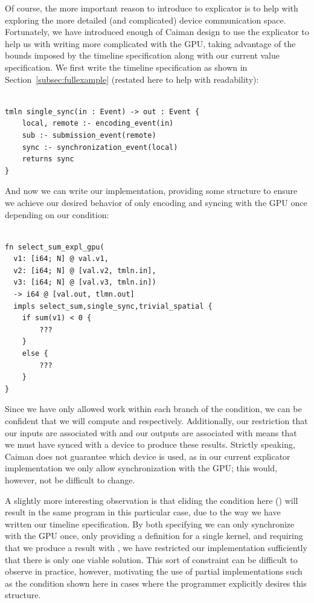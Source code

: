 Of course, the more important reason to introduce to explicator is to help with exploring the more detailed (and complicated) device communication space.  Fortunately, we have introduced enough of Caiman design to use the explicator to help us with writing more complicated with the GPU, taking advantage of the bounds imposed by the timeline specification along with our current value specification.  We first write the timeline specification as shown in Section~\ref{subsec:fullexample} (restated here to help with readability):
%
\begin{lstlisting}

tmln single_sync(in : Event) -> out : Event {
    local, remote :- encoding_event(in)
    sub :- submission_event(remote)
    sync :- synchronization_event(local)
    returns sync
}
\end{lstlisting}
%
And now we can write our implementation, providing some structure to ensure we achieve our desired behavior of only encoding and syncing with the GPU once depending on our condition:
%
\begin{lstlisting}

fn select_sum_expl_gpu(
  v1: [i64; N] @ val.v1, 
  v2: [i64; N] @ [val.v2, tmln.in], 
  v3: [i64; N] @ [val.v3, tmln.in]) 
  -> i64 @ [val.out, tlmn.out] 
  impls select_sum,single_sync,trivial_spatial {
    if sum(v1) < 0 {
        ???
    }
    else {
        ???
    } 
}
\end{lstlisting}
%
Since we have only allowed work within each branch of the condition, we can be confident that we will compute  and  respectively.  Additionally, our restriction that our inputs are associated with  and our outputs are associated with  means that we must have synced with a device to produce these results.  Strictly speaking, Caiman does not guarantee which device is used, as in our current explicator implementation we only allow synchronization with the GPU; this would, however, not be difficult to change.

A slightly more interesting observation is that eliding the condition here () will result in the same program in this particular case, due to the way we have written our timeline specification.  By both specifying we can only synchronize with the GPU once, only providing a definition for a single  kernel, and requiring that we produce a result with , we have restricted our implementation sufficiently that there is only one viable solution.  This sort of constraint can be difficult to observe in practice, however, motivating the use of partial implementations such as the condition shown here in cases where the programmer explicitly desires this structure.


